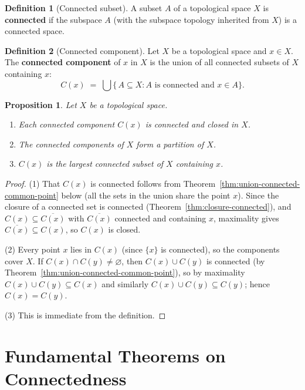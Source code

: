 \documentclass[11pt,a4paper,twoside]{book}
\newtheorem{proposition}[theorem]{Proposition}
\theoremstyle{remark}
\theoremstyle{definition}
\theoremstyle{definition}
\newtheorem{definition}{Definition}[section]
\begin{document}
\begin{definition}[Connected subset]\label{def:connected-subset}
A subset $A$ of a topological space $X$ is \textbf{connected} if
the subspace $A$ (with the subspace topology inherited from $X$)
is a connected space.
\end{definition}

\begin{definition}[Connected component]\label{def:connected-component}
Let $X$ be a topological space and $x\in X$.  The \textbf{connected
component} of $x$ in $X$ is the union of all connected subsets of $X$
containing $x$:
\[
   C(x) \;=\; \bigcup\bigl\{\,A\subseteq X : A\text{ is connected and }
               x\in A\bigr\}.
\]
\end{definition}

\begin{proposition}\label{prop:component-props}
Let $X$ be a topological space.
\begin{enumerate}
\item Each connected component $C(x)$ is connected and closed in $X$.
\item The connected components of $X$ form a partition of $X$.
\item $C(x)$ is the largest connected subset of $X$ containing $x$.
\end{enumerate}
\end{proposition}

\begin{proof}
(1) That $C(x)$ is connected follows from
Theorem~\ref{thm:union-connected-common-point} below (all the sets
in the union share the point $x$).  Since the closure of a connected
set is connected (Theorem~\ref{thm:closure-connected}), and
$C(x)\subseteq\overline{C(x)}$ with $\overline{C(x)}$ connected
and containing $x$, maximality gives
$\overline{C(x)}\subseteq C(x)$, so $C(x)$ is closed.

(2) Every point $x$ lies in $C(x)$ (since $\{x\}$ is connected),
so the components cover $X$.  If $C(x)\cap C(y)\neq\varnothing$,
then $C(x)\cup C(y)$ is connected (by
Theorem~\ref{thm:union-connected-common-point}), so by maximality
$C(x)\cup C(y)\subseteq C(x)$ and similarly
$C(x)\cup C(y)\subseteq C(y)$; hence $C(x)=C(y)$.

(3) This is immediate from the definition.
\end{proof}

\section{Fundamental Theorems on Connectedness}
\label{sec:fund-connected}
\end{document}

